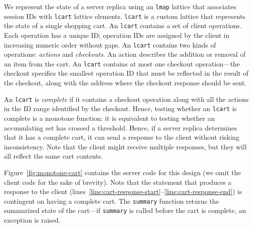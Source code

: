 
We represent the state of a server replica using an \texttt{lmap} lattice that
associates session IDs with \texttt{lcart} lattice elements. \texttt{lcart} is a
custom lattice that represents the state of a single shopping cart. An
\texttt{lcart} contains a set of client operations. Each operation has a unique
ID; operation IDs are assigned by the client in increasing numeric order without
gaps. An \texttt{lcart} contains two kinds of operations: \emph{actions} and
\emph{checkouts}. An action describes the addition or removal of an item from
the cart. An \texttt{lcart} contains at most one checkout operation---the
checkout specifies the smallest operation ID that must be reflected in the
result of the checkout, along with the address where the checkout response
should be sent.

An \texttt{lcart} is \emph{complete} if it contains a checkout operation along
with all the actions in the ID range identified by the checkout. Hence, testing
whether an \texttt{lcart} is complete is a monotone function: it is equivalent
to testing whether an accumulating set has crossed a threshold. Hence, if a
server replica determines that it has a complete cart, it can send a response to
the client without risking inconsistency. Note that the client might receive
multiple responses, but they will all reflect the same cart contents.

Figure~\ref{fig:monotone-cart} contains the server code for this design (we omit
the client code for the sake of brevity). Note that the statement that produces
a response to the client
(lines~\ref{line:cart-response-start}--\ref{line:cart-response-end}) is
contingent on having a complete cart. The \texttt{summary} function returns the
summarized state of the cart---if \texttt{summary} is called before the cart is
complete, an exception is raised.


